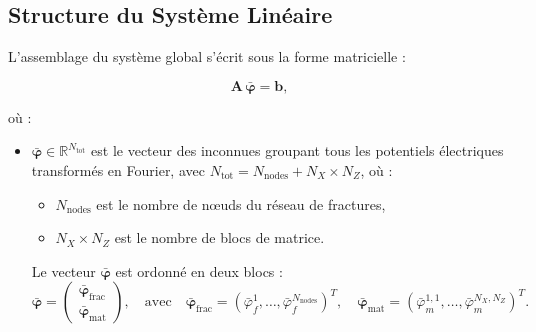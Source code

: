 \subsection{Structure du Système Linéaire}

L'assemblage du système global s'écrit sous la forme matricielle :

\begin{equation}
\mathbf{A}\,\bar{\boldsymbol{\varphi}}=\mathbf{b},
\label{eq:global_system}
\end{equation}

où :
\begin{itemize}[label = \textbullet]
    \item $\bar{\boldsymbol{\varphi}}\in\mathbb{R}^{N_{\text{tot}}}$ est le vecteur des inconnues groupant tous les potentiels électriques transformés en Fourier, avec $N_{\text{tot}}=N_{\text{nodes}}+N_X\times N_Z$, où :
    \begin{itemize}
        \item $N_{\text{nodes}}$ est le nombre de nœuds du réseau de fractures,
        \item $N_X\times N_Z$ est le nombre de blocs de matrice.
    \end{itemize}
    Le vecteur $\bar{\boldsymbol{\varphi}}$ est ordonné en deux blocs :
    $$\bar{\boldsymbol{\varphi}} = \begin{pmatrix} \bar{\boldsymbol{\varphi}}_{\text{frac}} \\ \bar{\boldsymbol{\varphi}}_{\text{mat}} \end{pmatrix}, \quad \text{avec} \quad \bar{\boldsymbol{\varphi}}_{\text{frac}}=\left(\bar{\varphi}_f^1,\ldots,\bar{\varphi}_f^{N_{\text{nodes}}}\right)^T, \quad \bar{\boldsymbol{\varphi}}_{\text{mat}}=\left(\bar{\varphi}_m^{1,1},\ldots,\bar{\varphi}_m^{N_X,N_Z}\right)^T.$$
    

\end{itemize}
